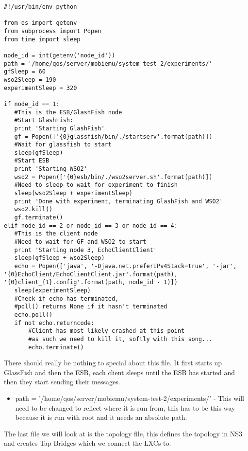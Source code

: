 \lstset{language=Python, style=python}
\begin{lstlisting}[frame=single, caption={System-test-2.py}, label=mobiemu:system-test-2.py, breaklines=true]
#!/usr/bin/env python

from os import getenv
from subprocess import Popen
from time import sleep

node_id = int(getenv('node_id'))
path = '/home/qos/server/mobiemu/system-test-2/experiments/'
gfSleep = 60
wso2Sleep = 190
experimentSleep = 320

if node_id == 1:
   #This is the ESB/GlashFish node
   #Start GlashFish:
   print 'Starting GlashFish'
   gf = Popen(['{0}glassfish/bin/./startserv'.format(path)])
   #Wait for glassfish to start
   sleep(gfSleep)
   #Start ESB
   print 'Starting WSO2'
   wso2 = Popen(['{0}esb/bin/./wso2server.sh'.format(path)])
   #Need to sleep to wait for experiment to finish
   sleep(wso2Sleep + experimentSleep)    
   print 'Done with experiment, terminating GlashFish and WSO2'
   wso2.kill()
   gf.terminate()
elif node_id == 2 or node_id == 3 or node_id == 4:
   #This is the client node
   #Need to wait for GF and WSO2 to start
   print 'Starting node 3, EchoClientClient'
   sleep(gfSleep + wso2Sleep)
   echo = Popen(['java', '-Djava.net.preferIPv4Stack=true', '-jar', '{0}EchoClient/EchoClientClient.jar'.format(path), '{0}client_{1}.config'.format(path, node_id - 1)])
   sleep(experimentSleep)
   #Check if echo has terminated,
   #poll() returns None if it hasn't terminated
   echo.poll()
   if not echo.returncode:
       #Client has most likely crashed at this point
       #as such we need to kill it, softly with this song...
       echo.terminate()
\end{lstlisting}

There should really be nothing to special about this file. It first starts up GlassFish and then the ESB, each client sleeps until the ESB has started and then they start sending their messages.

\begin{itemize}\label{mobiemu:system-test-2.py changes}
\item path = '/home/qos/server/mobiemu/system-test-2/experiments/' - This will need to be changed to reflect where it is run from, this has to be this way because it is run with root and it needs an absolute path.
\end{itemize}

The last file we will look at is the topology file, this defines the topology in NS3 and creates Tap-Bridges which we connect the LXCs to.


